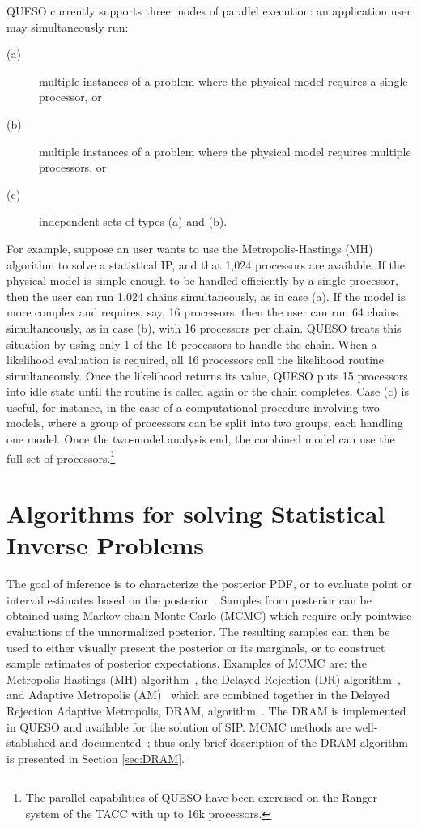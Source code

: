 QUESO currently supports three modes of parallel execution:
an application user may simultaneously run:
\begin{description}
\item[(a)] multiple instances of a problem where the physical model requires a single processor, or
\item[(b)] multiple instances of a problem where the physical model requires multiple processors, or
\item[(c)] independent sets of types (a) and (b).
\end{description}

For example, suppose an user wants to use the Metropolis-Hastings (MH) algorithm to solve a statistical IP, and that 1,024 processors are available.
If the physical model is simple enough to be handled efficiently by a single processor, then the user can run 1,024 chains simultaneously, as in case (a).
If the model is more complex and requires, say, 16 processors, then the user can run 64 chains simultaneously, as in case (b), with 16 processors per chain.
QUESO treats this situation by using only 1 of the 16 processors to handle the chain.
When a likelihood evaluation is required, all 16 processors call the likelihood routine simultaneously.
Once the likelihood returns its value, QUESO puts  15 processors into idle state until the routine is called again or the chain completes.
Case (c) is useful, for instance, in the case of a computational procedure involving two models,
where a group of processors can be split into two groups, each handling one model.
Once the two-model analysis end, the combined model can use the full set of processors.\footnote{The parallel capabilities of QUESO have been exercised on the Ranger system of the TACC \cite{tacc} with up to 16k processors.}



\section{Algorithms for solving Statistical Inverse Problems}

The goal of inference is to characterize the posterior PDF, or to evaluate point or interval estimates based on the posterior~\cite{HuMa01}.
Samples from posterior can be obtained using Markov chain Monte Carlo (MCMC) which require only pointwise evaluations of the unnormalized posterior.
The resulting samples can then be used to either visually present the posterior or its marginals, or to construct sample estimates of posterior expectations.
Examples of MCMC are: the Metropolis-Hastings (MH) algorithm~\cite{Metr_1953,Hast_1970}, the Delayed Rejection (DR) algorithm~\cite{GrMi01,Mira01}, and
Adaptive Metropolis (AM)~\cite{HaSaTa01} which are combined together in the Delayed Rejection Adaptive Metropolis, DRAM,  algorithm~\cite{HaLaMiSa06}. The DRAM is implemented in QUESO and available for the solution of SIP. MCMC methods are well-stablished and documented~\cite{CaSo07,GrMi01,HaLaMiSa06,HaSaTa01,Hast_1970,KaSo05,Laine08,Metr_1953,Mira01}; thus only brief description of the DRAM algorithm is presented in Section \ref{sec:DRAM}. 


